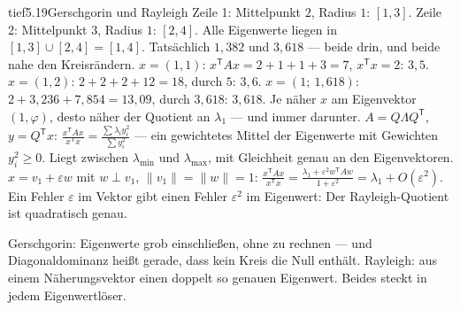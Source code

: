 \begin{loesungkarte}{tief}{5.19}{Gerschgorin und Rayleigh}
Zeile 1: Mittelpunkt $2$, Radius $1$: $[1, 3]$. Zeile 2: Mittelpunkt $3$, Radius $1$: $[2, 4]$. Alle Eigenwerte liegen in $[1, 3]\cup[2, 4] = [1, 4]$. Tatsächlich $1{,}382$ und $3{,}618$ --- beide drin, und beide nahe den Kreisrändern.
$x = (1, 1)$: $x^{\mathsf T}Ax = 2 + 1 + 1 + 3 = 7$, $x^{\mathsf T}x = 2$: $3{,}5$. $x = (1, 2)$: $2 + 2 + 2 + 12 = 18$, durch $5$: $3{,}6$. $x = (1;\ 1{,}618)$: $2 + 3{,}236 + 7{,}854 = 13{,}09$, durch $3{,}618$: $3{,}618$. Je näher $x$ am Eigenvektor $(1, \varphi)$, desto näher der Quotient an $\lambda_1$ --- und immer darunter.
$A = Q\Lambda Q^{\mathsf T}$, $y = Q^{\mathsf T}x$: $\frac{x^{\mathsf T}Ax}{x^{\mathsf T}x} = \frac{\sum\lambda_iy_i^{2}}{\sum y_i^{2}}$ --- ein gewichtetes Mittel der Eigenwerte mit Gewichten $y_i^{2}\ge0$. Liegt zwischen $\lambda_{\min}$ und $\lambda_{\max}$, mit Gleichheit genau an den Eigenvektoren.
$x = v_1 + \varepsilon w$ mit $w\perp v_1$, $\|v_1\| = \|w\| = 1$: $\frac{x^{\mathsf T}Ax}{x^{\mathsf T}x} = \frac{\lambda_1 + \varepsilon^{2}w^{\mathsf T}Aw}{1 + \varepsilon^{2}} = \lambda_1 + O(\varepsilon^{2})$. Ein Fehler $\varepsilon$ im Vektor gibt einen Fehler $\varepsilon^{2}$ im Eigenwert: Der Rayleigh-Quotient ist quadratisch genau.
\begin{mitnehmen}\kastentext
Gerschgorin: Eigenwerte grob einschließen, ohne zu rechnen --- und Diagonaldominanz heißt gerade, dass kein Kreis die Null enthält. Rayleigh: aus einem Näherungsvektor einen doppelt so genauen Eigenwert. Beides steckt in jedem Eigenwertlöser.
\end{mitnehmen}
\end{loesungkarte}

